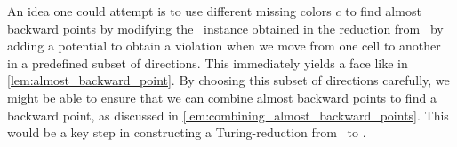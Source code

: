 An idea one could attempt is to use different missing colors $c$ to find almost backward points by modifying the \EndOfLine\ instance obtained in the reduction from \Tarskistar\ by adding a potential to obtain a violation when we move from one cell to another in a predefined subset of directions. This immediately yields a face like in \cref{lem:almost_backward_point}. By choosing this subset of directions carefully, we might be able to ensure that we can combine almost backward points to find a backward point, as discussed in \cref{lem:combining_almost_backward_points}. This would be a key step in constructing a Turing-reduction from \Tarskistar\ to \EndOfPotentialLine\@.